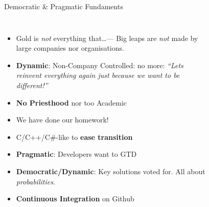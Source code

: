 \documentclass[xcolor=dvipsnames]{beamer}
\begin{document}
\begin{frame}[fragile]{Democratic \& Pragmatic Fundaments}
    \begin{columns}[c] %
      \begin{itemize}[<+->]
      \item Gold is \emph{not} everything that\ldots --- Big leaps are
        \emph{not} made by large companies nor organisations.
      \item \textbf{Dynamic}: Non-Company Controlled: no more: \textit{``Lets reinvent
          everything again just because we want to be different!''}
      \item \textbf{No Priesthood} nor too Academic
      \item We have done our homework!
      \item C/C++/C\#-like to \textbf{ease transition}
      \item \textbf{Pragmatic}: Developers want to GTD
      \item \textbf{Democratic/Dynamic}: Key solutions voted for. All about
        \emph{probabilities}.
      \item \textbf{Continuous Integration} on Github
      \end{itemize}
      \begin{figure}
      \end{figure}
    \end{columns}
\end{frame}
\end{document}
